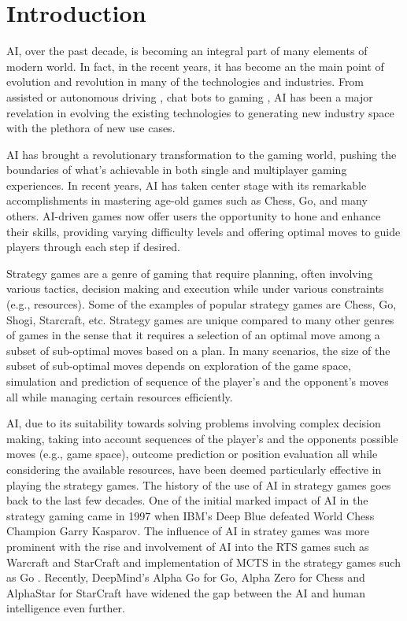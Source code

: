\chapter*{Introduction}

\ac{AI}, over the past decade, is becoming an integral part of many elements of modern world. In fact, in the recent years, it has become an the main point of evolution and revolution in many of the technologies and industries. From assisted or autonomous driving \citep{Ma2020Artificial}, chat bots \cite{Wu2023ABrief} to gaming \cite{Skinner2010Artificial}, \ac{AI} has been a major revelation in evolving the existing technologies to generating new industry space with the plethora of new use cases.   

\ac{AI} has brought a revolutionary transformation to the gaming world, pushing the boundaries
of what's achievable in both single and multiplayer gaming experiences. In recent years, \ac{AI} has taken center
stage with its remarkable accomplishments in mastering age-old games such as Chess, Go, and many others.
\ac{AI}-driven games now offer users the opportunity to hone and enhance their skills, providing varying difficulty
levels and offering optimal moves to guide players through each step if desired.

Strategy games are a genre of gaming that require planning, often involving various tactics, decision making and execution while under various constraints (e.g., resources). Some of the examples of popular strategy games are Chess, Go, Shogi, Starcraft, etc. Strategy games are unique compared to many other genres of games in the sense that it requires a selection of an optimal move among a subset of sub-optimal moves based on  a plan. In many scenarios, the size of the subset of sub-optimal moves depends on exploration of the game space, simulation and prediction of sequence of the player's and the opponent's moves all while managing certain resources efficiently.

\ac{AI}, due to its suitability towards solving problems involving complex decision making, taking into account sequences of the player's and the opponents possible moves (e.g., game space), outcome prediction or position evaluation all while considering the available resources, have been deemed particularly effective in playing the strategy games. The history of the use of \ac{AI} in strategy games goes back to the last few decades. One of the initial marked impact of \ac{AI} in the strategy gaming came in 1997 when IBM's Deep Blue \cite{Campbell2002Deep} defeated World Chess Champion Garry Kasparov. The influence of \ac{AI} in stratey games was more prominent with the rise and involvement of \ac{AI} into the \ac{RTS} games such as Warcraft and StarCraft \cite{Robertson2014Review} and implementation of \ac{MCTS} in the strategy games such as Go \cite{Huang2011Monte}. Recently, DeepMind's Alpha Go for Go, Alpha Zero for Chess \cite{Silver2017Mastering} and AlphaStar for StarCraft \cite{Team2019Alphastar} have widened the gap between the \ac{AI} and human intelligence even further.


